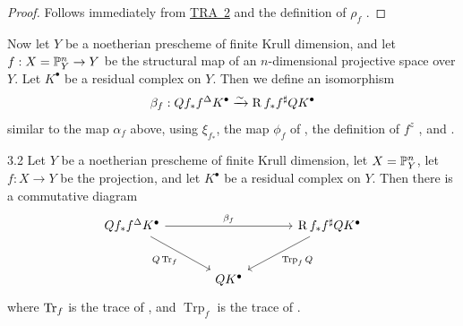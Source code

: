 \begin{proof}
Follows immediately from \hyperref[tra:6.4.2]{TRA~2}  and the definition of $\rho_{f}$ .
\end{proof}

Now let $Y$ be a noetherian prescheme of finite Krull dimension, and let $f: X = \mathbb{P}^{n}_{Y} \to Y$ be the structural map of an $n$-dimensional projective space over $Y$. Let $K^{\bullet}$ be a residual complex on $Y$. Then we define an isomorphism
\[
\beta_{f}: Q f_{*} f^{\Delta} K^{\bullet} \xrightarrow{\sim} \operatorname{R} f_{*} f^{\sharp} Q K^{\bullet}
\]
similar to the map $\alpha_{f}$ above, using $\xi_{f_{*}}$, the map $\phi_{f}$ of , the definition of $f^{z}$ , and .

\begin{bookproposition}{3.2}\label{prop:7.3.2}
Let $Y$ be a noetherian prescheme of finite Krull dimension, let $X = \mathbb{P}^{n}_{Y}$, let $f: X \to Y$ be the projection, and let $K^{\bullet}$ be a residual complex on $Y$. Then there is a commutative diagram
\[
\begin{tikzcd}[row sep=large, column sep=large]
Q f_{*} f^{\Delta} K^{\bullet} \ar[rr,"\beta_{f}"] \ar[rd,"Q \Tr_{f}"'] && \RR f_{*} f^{\sharp} Q K^{\bullet} \ar[dl,"\operatorname{Trp}_{f}Q"] \\
&Q K^{\bullet}
\end{tikzcd}
\]
where $\operatorname{Tr}_{f}$ is the trace of , and $\operatorname{Trp}_{f}$ is the trace of .
\end{bookproposition}

